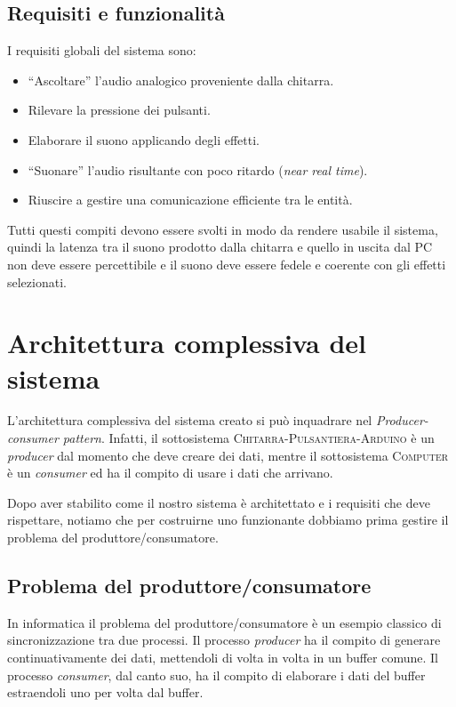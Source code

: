 \documentclass[a4paper,11pt]{article}
\begin{document}
\subsection{Requisiti e funzionalità}
I requisiti globali del sistema sono:
\begin{itemize}
    \item ``Ascoltare'' l'audio analogico proveniente dalla chitarra.
    \item Rilevare la pressione dei pulsanti.
    \item Elaborare il suono applicando degli effetti.
    \item ``Suonare'' l'audio risultante con poco ritardo (\textit{near real time}).
    \item Riuscire a gestire una comunicazione efficiente tra le entità.
\end{itemize}

Tutti questi compiti devono essere svolti in modo da rendere usabile il sistema, quindi la latenza tra il suono prodotto dalla chitarra e quello in uscita dal PC non deve essere percettibile e il suono deve essere fedele e coerente con gli effetti selezionati.

\section{Architettura complessiva del sistema}

L'architettura complessiva del sistema creato si può inquadrare nel \textit{Producer-consumer pattern}. Infatti, il sottosistema \textsc{Chitarra-Pulsantiera-Arduino} è un \textit{producer} dal momento che deve creare dei dati, mentre il sottosistema \textsc{Computer} è un \textit{consumer} ed ha il compito di usare i dati che arrivano.

Dopo aver stabilito come il nostro sistema è architettato e i requisiti che deve rispettare, notiamo che per costruirne uno funzionante dobbiamo prima gestire il problema del produttore/consumatore.

\subsection{Problema del produttore/consumatore}
In informatica il problema del produttore/consumatore è un esempio classico di sincronizzazione tra due processi. Il processo \textit{producer} ha il compito di generare continuativamente dei dati, mettendoli di volta in volta in un buffer comune. Il processo \textit{consumer}, dal canto suo, ha il compito di elaborare i dati del buffer estraendoli uno per volta dal buffer.
\end{document}
